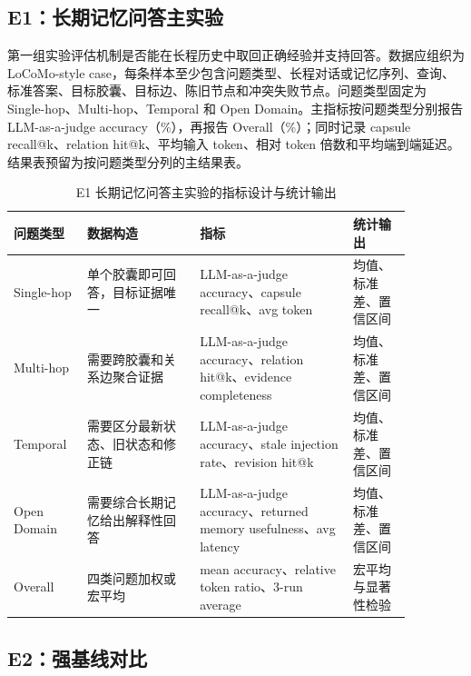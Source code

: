 \documentclass[a4paper,fleqn]{cas-sc}
\begin{document}
\begin{CJK*}{UTF8}{gbsn}
\subsection{E1：长期记忆问答主实验}

第一组实验评估机制是否能在长程历史中取回正确经验并支持回答。数据应组织为 LoCoMo-style case，每条样本至少包含问题类型、长程对话或记忆序列、查询、标准答案、目标胶囊、目标边、陈旧节点和冲突失败节点。问题类型固定为 Single-hop、Multi-hop、Temporal 和 Open Domain。主指标按问题类型分别报告 LLM-as-a-judge accuracy（\%），再报告 Overall（\%）；同时记录 capsule recall@k、relation hit@k、平均输入 token、相对 token 倍数和平均端到端延迟。结果表预留为按问题类型分列的主结果表。

\begin{table}[t]
\centering
\scriptsize
\caption{E1 长期记忆问答主实验的指标设计与统计输出}
\label{tab:e1-main-qa}
\setlength{\tabcolsep}{3pt}
\begin{tabular}{P{0.15\linewidth}P{0.25\linewidth}P{0.34\linewidth}P{0.13\linewidth}}
\toprule
问题类型 & 数据构造 & 指标 & 统计输出 \\
\midrule
Single-hop & 单个胶囊即可回答，目标证据唯一 & LLM-as-a-judge accuracy、capsule recall@k、avg token & 均值、标准差、置信区间 \\
Multi-hop & 需要跨胶囊和关系边聚合证据 & LLM-as-a-judge accuracy、relation hit@k、evidence completeness & 均值、标准差、置信区间 \\
Temporal & 需要区分最新状态、旧状态和修正链 & LLM-as-a-judge accuracy、stale injection rate、revision hit@k & 均值、标准差、置信区间 \\
Open Domain & 需要综合长期记忆给出解释性回答 & LLM-as-a-judge accuracy、returned memory usefulness、avg latency & 均值、标准差、置信区间 \\
Overall & 四类问题加权或宏平均 & mean accuracy、relative token ratio、3-run average & 宏平均与显著性检验 \\
\bottomrule
\end{tabular}
\end{table}

\subsection{E2：强基线对比}


\end{CJK*}
\end{document}
